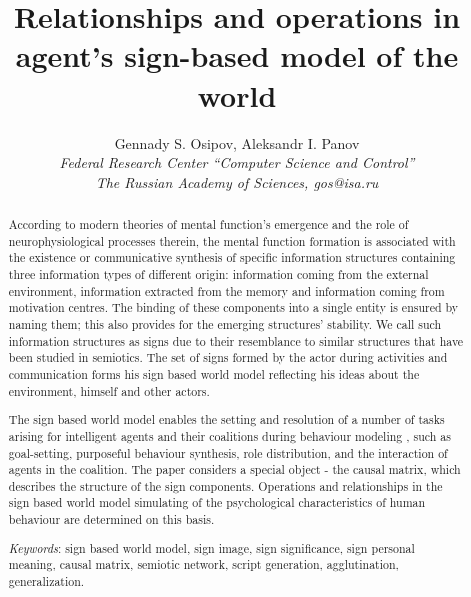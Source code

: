 \documentclass[12pt]{scrartcl}
\title{Relationships and operations in agent's sign-based model of the world}
\author{Gennady S. Osipov, Aleksandr I. Panov\\
	{\large\slshape Federal Research Center ``Computer Science and Control''}\\{\large\slshape The Russian Academy of Sciences, gos@isa.ru}}
\begin{document}
	
	\maketitle{}
	\begin{abstract}
		According to modern theories of mental function's emergence and the role of neurophysiological processes therein, the mental function formation is associated with the existence or communicative synthesis of specific information structures containing three information types of different origin: information coming from the external environment, information extracted from the memory and information coming from motivation centres. The binding of these components into a single entity is ensured by naming them; this also provides for the emerging structures’ stability. We call such information structures as signs due to their resemblance to similar structures that have been studied in semiotics. The set of signs formed by the actor during activities and communication forms his sign based world model reflecting his ideas about the environment, himself and other actors.
		
		The sign based world model enables the setting and resolution of a number of tasks arising for intelligent agents and their coalitions during behaviour modeling , such as goal-setting, purposeful behaviour synthesis, role distribution, and the interaction of agents in the coalition. The paper considers a special object - the causal matrix, which describes the structure of the sign components. Operations and relationships in the sign based world model simulating of the psychological characteristics of human behaviour are determined on this basis.

		\par\bigskip
		\textit{Keywords}: sign based world model, sign image, sign significance, sign personal meaning, causal matrix, semiotic network, script generation, agglutination, generalization.
	\end{abstract}
	
	
\end{document}
